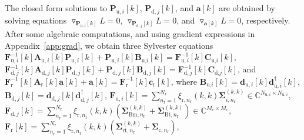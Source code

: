 \documentclass[10pt,journal]{IEEEtran}
\newcommand{\paren}[1]{\left({#1}\right)}
\newcommand{\bracket}[1]{{\left [{#1}\right ]}}
\newcommand{\rr}{_\mathrm{r}}
\newcommand{\B}{\textrm{B}}
\newcommand{\dBjone}{\mathbf{d}_{\mathrm{d},j}\bracket{k}}
\newcommand{\dBjoneH}{\mathbf{d}^\dagger_{\textrm{d},j}\bracket{k}}
\newcommand{\PiB}{\mathbf{P}_{\textrm{u},i}\bracket{k}}
\newcommand{\PBj}{\mathbf{P}_{\textrm{d},j}\bracket{k}}
\theoremstyle{definition}
\begin{document}
		The closed form solutions to $\PiB$, $\PBj$, and $\mathbf{a}\bracket{k}$ are obtained by solving equations $\triangledown_{\mathbf{P}_{\textrm{u},i}\bracket{k}}L=0$, $\triangledown_{\mathbf{P}_{\textrm{d},j}\bracket{k}}L=0$, and $\triangledown_{\mathbf{a}\bracket{k}}L=0$, respectively.
		After some algebraic computations, %
		and using gradient expressions in Appendix~\ref{app:grad}, we obtain three Sylvester equations $\mathbf{F}_{\textrm{u},i}^{-1}\bracket{k}\mathbf{A}_{\textrm{u},i}\bracket{k}\mathbf{P}_{\textrm{u},i}\bracket{k}+\mathbf{P}_{\textrm{u},i}\bracket{k}\mathbf{B}_{\textrm{u,}i}\bracket{k}=\mathbf{F}_{\textrm{u},i}^{-1}\bracket{k}\mathbf{C}_{\textrm{u,}i}\bracket{k}$, $\mathbf{F}_{\textrm{d},j}^{-1}\bracket{k}\mathbf{A}_{\textrm{d},j}\bracket{k}\mathbf{P}_{\textrm{d},j}\bracket{k}+\mathbf{P}_{\textrm{d},j}\bracket{k}\mathbf{B}_{\textrm{d},j}\bracket{k}=\mathbf{F}_{\textrm{d},j}^{-1}\bracket{k}\mathbf{C}_{\textrm{d,}j}\bracket{k}$, and $\mathbf{F}_{\textrm{r}}^{-1}\bracket{k}\mathbf{A}_{\textrm{r}}\bracket{k}\mathbf{a}\bracket{k}+\mathbf{a}\bracket{k}=\mathbf{F}_{\textrm{r}}^{-1}\bracket{k}\mathbf{c}_{\textrm{r}}\bracket{k}$, where $\mathbf{B}_{\textrm{u,}i}\bracket{k} =\mathbf{d}_{\mathrm{u},i}\bracket{k}\mathbf{d}^\dagger_{\textrm{u},i}\bracket{k}$, $\mathbf{B}_{\textrm{d},j}\bracket{k}=\dBjone\dBjoneH$, $\mathbf{F}_{\textrm{u},i}\bracket{k}=\sum_{n\rr=1}^{N\rr}\xi_{\textrm{r},n\rr}\paren{k,k}\boldsymbol{\Sigma}^{\paren{k,k}}_{i,n\rr}\in\mathbb{C}^{N_{\textrm{u},i}\times N_{\textrm{u},i}}$, $\mathbf{F}_{\textrm{d},j}\bracket{k}=\sum_{n\rr=1}^{N\rr}\xi_{\textrm{r},n\rr}\paren{k,k}\paren{\boldsymbol{\Sigma}^{\paren{k,k}}_{\textrm{Bm},n\rr}+\boldsymbol{\Sigma}^{\paren{k,k}}_{\textrm{Bt},n\rr}}\in\mathbb{C}^{M_{\textrm{c}}\times M_{\textrm{c}}}$, $\mathbf{F}_{\textrm{r}}\bracket{k}=\sum_{n\rr=1}^{\mathit{N}\rr}\xi_{\textrm{r},n\rr}\paren{k,k}\paren{\boldsymbol{\Sigma}^{\paren{k,k}}_{\mathrm{rt},n\rr}+\boldsymbol{\Sigma}_{\textrm{c},n\rr}}$,
\end{document}
